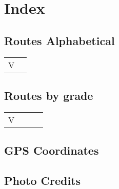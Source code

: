 \chapter{Index}
\lhead{\textcolor{\chapterColor}{\rule[-2pt]{\textwidth}{15pt}}}
\section{Routes Alphabetical}
\begin{center}
\begin{supertabular}{lr}
 V &  \\
\end{supertabular}
\end{center}
\section{Routes by grade}
\begin{center}
\begin{supertabular}{lrlr}
V& &&  \\
\end{supertabular}
\end{center}
\section{GPS Coordinates}
\section{Photo Credits}